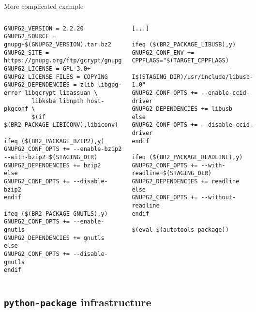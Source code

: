 \begin{frame}[fragile]{More complicated  example}
  \begin{columns}
    \begin{block}{}
      \begin{verbatim}
GNUPG2_VERSION = 2.2.20
GNUPG2_SOURCE = gnupg-$(GNUPG2_VERSION).tar.bz2
GNUPG2_SITE = https://gnupg.org/ftp/gcrypt/gnupg
GNUPG2_LICENSE = GPL-3.0+
GNUPG2_LICENSE_FILES = COPYING
GNUPG2_DEPENDENCIES = zlib libgpg-error libgcrypt libassuan \
        libksba libnpth host-pkgconf \
        $(if $(BR2_PACKAGE_LIBICONV),libiconv)

ifeq ($(BR2_PACKAGE_BZIP2),y)
GNUPG2_CONF_OPTS += --enable-bzip2 --with-bzip2=$(STAGING_DIR)
GNUPG2_DEPENDENCIES += bzip2
else
GNUPG2_CONF_OPTS += --disable-bzip2
endif

ifeq ($(BR2_PACKAGE_GNUTLS),y)
GNUPG2_CONF_OPTS += --enable-gnutls
GNUPG2_DEPENDENCIES += gnutls
else
GNUPG2_CONF_OPTS += --disable-gnutls
endif
\end{verbatim}
\end{block}
    \begin{block}{}
      \begin{verbatim}
[...]

ifeq ($(BR2_PACKAGE_LIBUSB),y)
GNUPG2_CONF_ENV += CPPFLAGS="$(TARGET_CPPFLAGS)
                            -I$(STAGING_DIR)/usr/include/libusb-1.0"
GNUPG2_CONF_OPTS += --enable-ccid-driver
GNUPG2_DEPENDENCIES += libusb
else
GNUPG2_CONF_OPTS += --disable-ccid-driver
endif

ifeq ($(BR2_PACKAGE_READLINE),y)
GNUPG2_CONF_OPTS += --with-readline=$(STAGING_DIR)
GNUPG2_DEPENDENCIES += readline
else
GNUPG2_CONF_OPTS += --without-readline
endif

$(eval $(autotools-package))
      \end{verbatim}
    \end{block}
  \end{columns}
\end{frame}

\subsection{{\tt python-package} infrastructure}

